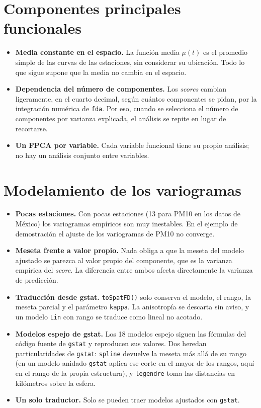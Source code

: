 \documentclass[11pt,a4paper]{article}
\newcommand{\code}[1]{\texttt{#1}}
\begin{document}
\section{Componentes principales funcionales}

\begin{itemize}
  \item \textbf{Media constante en el espacio.} La función media $\mu(t)$ es
        el promedio simple de las curvas de las estaciones, sin considerar su
        ubicación. Todo lo que sigue supone que la media no cambia en el
        espacio.
  \item \textbf{Dependencia del número de componentes.} Los \emph{scores}
        cambian ligeramente, en el cuarto decimal, según cuántos componentes
        se pidan, por la integración numérica de \code{fda}. Por eso, cuando
        se selecciona el número de componentes por varianza explicada, el
        análisis se repite en lugar de recortarse.
  \item \textbf{Un FPCA por variable.} Cada variable funcional tiene su
        propio análisis; no hay un análisis conjunto entre variables.
\end{itemize}

\section{Modelamiento de los variogramas}

\begin{itemize}
  \item \textbf{Pocas estaciones.} Con pocas estaciones (13 para PM10 en los
        datos de México) los variogramas empíricos son muy inestables. En el
        ejemplo de demostración el ajuste de los variogramas de PM10 no
        converge.
  \item \textbf{Meseta frente a valor propio.} Nada obliga a que la meseta
        del modelo ajustado se parezca al valor propio del componente, que es
        la varianza empírica del \emph{score}. La diferencia entre ambos
        afecta directamente la varianza de predicción.
  \item \textbf{Traducción desde gstat.} \code{toSpatFD()} solo conserva el
        modelo, el rango, la meseta parcial y el parámetro \code{kappa}. La
        anisotropía se descarta sin aviso, y un modelo \code{Lin} con rango se
        traduce como lineal no acotado.
  \item \textbf{Modelos espejo de gstat.} Los 18 modelos espejo siguen las
        fórmulas del código fuente de \code{gstat} y reproducen sus valores.
        Dos heredan particularidades de \code{gstat}: \code{spline} devuelve
        la meseta más allá de su rango (en un modelo anidado \code{gstat}
        aplica ese corte en el mayor de los rangos, aquí en el rango de la
        propia estructura), y \code{legendre} toma las distancias en
        kilómetros sobre la esfera.
  \item \textbf{Un solo traductor.} Solo se pueden traer modelos ajustados con
        \code{gstat}.
\end{itemize}
\end{document}

